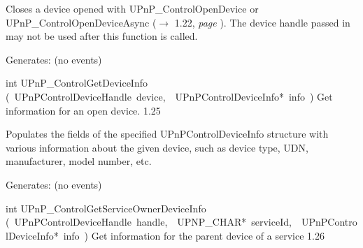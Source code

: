 \documentclass{article}
\begin{document}
\begin{cxxentry}
\begin{cxxfunction}
\begin{cxxdoc}
Closes a device opened with UPnP\_ControlOpenDevice or
UPnP\_ControlOpenDeviceAsync ($\rightarrow$ 1.22, {\em page }\pageref{cxx.1.22}).  The device handle passed in may
not be used after this function is called.

Generates:
(no events)


\end{cxxdoc}
\end{cxxfunction}
\begin{cxxfunction}
{int}
        {UPnP\_ControlGetDeviceInfo}
        {(\ UPnPControlDeviceHandle\ device,\ \ UPnPControlDeviceInfo*\ info\ )}
        {Get information for an open device. }
        {1.25}
\begin{cxxdoc}

Populates the fields of the specified UPnPControlDeviceInfo
structure with various information about the given device, such as
device type, UDN, manufacturer, model number, etc.

Generates:
(no events)


\end{cxxdoc}
\end{cxxfunction}
\begin{cxxfunction}
{int}
        {UPnP\_ControlGetServiceOwnerDeviceInfo}
        {(\ UPnPControlDeviceHandle\ handle,\ \ UPNP\_CHAR*\ serviceId,\ \ UPnPControlDeviceInfo*\ info\ )}
        {Get information for the parent device of a service }
        {1.26}
\begin{cxxdoc}


\end{cxxdoc}
\end{cxxfunction}
\end{cxxentry}
\end{document}
